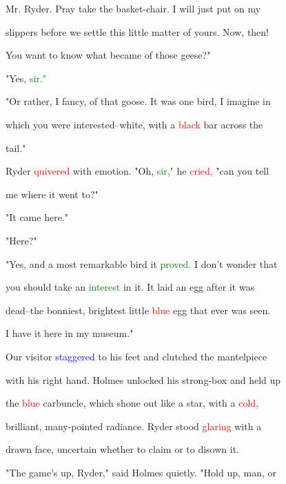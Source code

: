  Mr. Ryder. \textcolor{BurntOrange}{Pray} take the basket-chair. I will just put on my

 slippers before we settle this little matter of yours. Now, then!

 You want to know what became of those geese?"



 "Yes, \textcolor{green}{sir."}



 "Or rather, I \textcolor{BurntOrange}{fancy,} of that goose. It was one bird, I imagine in

 which you were interested--white, with a \textcolor{red}{black} bar across the

 tail."



 Ryder \textcolor{red}{quivered} with emotion. "Oh, \textcolor{green}{sir,"} he \textcolor{red}{cried,} "can you tell

 me where it went to?"



 "It came here."



 "Here?"



 "Yes, and a most \textcolor{BurntOrange}{remarkable} bird it \textcolor{green}{proved.} I don't wonder that

 you should take an \textcolor{green}{interest} in it. It laid an egg after it was

 dead--the bonniest, brightest little \textcolor{red}{blue} egg that ever was seen.

 I have it here in my museum."



 Our \textcolor{BurntOrange}{visitor} \textcolor{blue}{staggered} to his feet and clutched the mantelpiece

 with his right hand. Holmes unlocked his strong-box and held up

 the \textcolor{red}{blue} carbuncle, which shone out like a \textcolor{BurntOrange}{star,} with a \textcolor{red}{cold,}

 \textcolor{BurntOrange}{brilliant,} many-pointed \textcolor{BurntOrange}{radiance.} Ryder stood \textcolor{red}{glaring} with a

 drawn face, \textcolor{BurntOrange}{uncertain} whether to claim or to disown it.



 "The game's up, Ryder," said Holmes quietly. "Hold up, man, or

